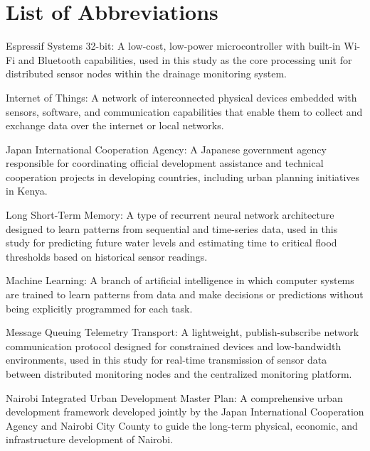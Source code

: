 \documentclass[12pt, a4paper]{article}
\begin{document}
\section*{List of Abbreviations}
\begin{description}[leftmargin=3cm, style=nextline]
    \item[ESP32] Espressif Systems 32-bit: A low-cost, 
    low-power microcontroller with built-in Wi-Fi and Bluetooth 
    capabilities, used in this study as the core processing unit 
    for distributed sensor nodes within the drainage monitoring 
    system.

    \item[IoT] Internet of Things: A network of interconnected 
    physical devices embedded with sensors, software, and 
    communication capabilities that enable them to collect and 
    exchange data over the internet or local networks.

    \item[JICA] Japan International Cooperation Agency: A Japanese 
    government agency responsible for coordinating official 
    development assistance and technical cooperation projects in 
    developing countries, including urban planning initiatives 
    in Kenya.

    \item[LSTM] Long Short-Term Memory: A type of recurrent neural 
    network architecture designed to learn patterns from sequential 
    and time-series data, used in this study for predicting future 
    water levels and estimating time to critical flood thresholds 
    based on historical sensor readings.

    \item[ML] Machine Learning: A branch of artificial intelligence 
    in which computer systems are trained to learn patterns from 
    data and make decisions or predictions without being explicitly 
    programmed for each task.

    \item[MQTT] Message Queuing Telemetry Transport: A lightweight, 
    publish-subscribe network communication protocol designed for 
    constrained devices and low-bandwidth environments, used in 
    this study for real-time transmission of sensor data between 
    distributed monitoring nodes and the centralized monitoring 
    platform.

    \item[NIUPLAN] Nairobi Integrated Urban Development Master Plan: 
    A comprehensive urban development framework developed jointly 
    by the Japan International Cooperation Agency and Nairobi City 
    County to guide the long-term physical, economic, and 
    infrastructure development of Nairobi.


\end{description}
\end{document}
